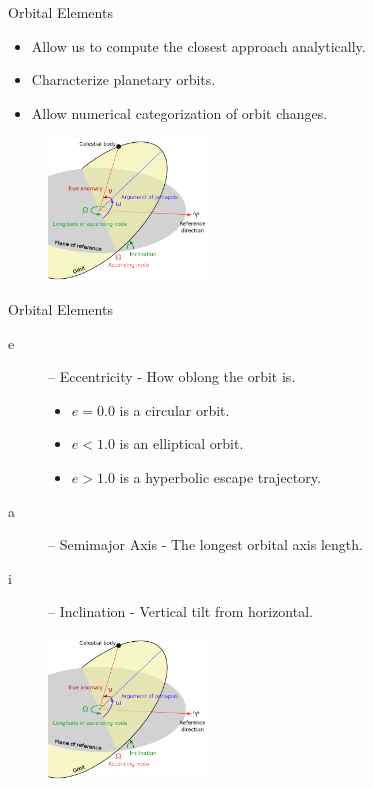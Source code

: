 \documentclass{beamer}
\begin{document}
\begin{frame}{Orbital Elements}
    \begin{itemize}
        \item Allow us to compute the closest approach analytically.
        \item Characterize planetary orbits.
        \item Allow numerical categorization of orbit changes.
    \end{itemize}
    \begin{figure}
        \centering
        \includegraphics[height=1.5in]{orbital_elems}
    \end{figure}

\end{frame}

\begin{frame}{Orbital Elements}
    \begin{description}
        \item[e] -- Eccentricity - How oblong the orbit is.
            \begin{itemize}
                \item $e = 0.0$ is a circular orbit.
                \item $e < 1.0$ is an elliptical orbit.
                \item $e > 1.0$ is a hyperbolic escape trajectory.
            \end{itemize}
        \item[a] -- Semimajor Axis - The longest orbital axis length.
        \item[i] -- Inclination - Vertical tilt from horizontal.
    \end{description}
    \begin{figure}
        \centering
        \includegraphics[height=1.5in]{orbital_elems}
    \end{figure}
\end{frame}
\end{document}
